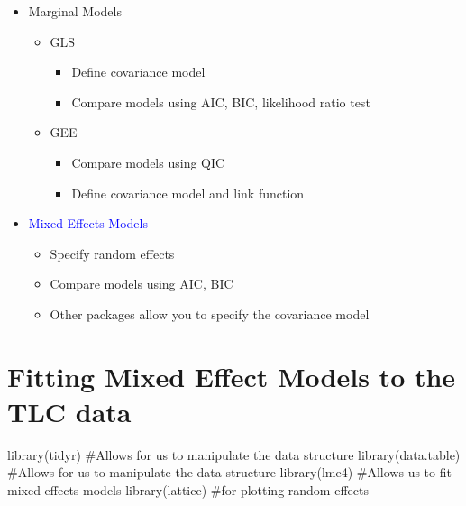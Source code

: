 \documentclass[
  letterpaper,
  DIV=11,
  numbers=noendperiod]{scrreprt}
\newenvironment{Shaded}{\begin{snugshade}}{\end{snugshade}}
\newcommand{\CommentTok}[1]{\textcolor[rgb]{0.37,0.37,0.37}{#1}}
\newcommand{\FunctionTok}[1]{\textcolor[rgb]{0.28,0.35,0.67}{#1}}
\newcommand{\NormalTok}[1]{\textcolor[rgb]{0.00,0.23,0.31}{#1}}
\providecommand{\tightlist}{%
  \setlength{\itemsep}{0pt}\setlength{\parskip}{0pt}}\usepackage{longtable,booktabs,array}
\begin{document}
\begin{itemize}
\tightlist
\item
  Marginal Models

  \begin{itemize}
  \tightlist
  \item
    GLS

    \begin{itemize}
    \tightlist
    \item
      Define covariance model
    \item
      Compare models using AIC, BIC, likelihood ratio test
    \end{itemize}
  \item
    GEE

    \begin{itemize}
    \tightlist
    \item
      Compare models using QIC
    \item
      Define covariance model and link function
    \end{itemize}
  \end{itemize}
\item
  \textcolor{blue}{Mixed-Effects Models}

  \begin{itemize}
  \tightlist
  \item
    Specify random effects
  \item
    Compare models using AIC, BIC
  \item
    Other packages allow you to specify the covariance model
  \end{itemize}
\end{itemize}

\hypertarget{fitting-mixed-effect-models-to-the-tlc-data}{%
\section{Fitting Mixed Effect Models to the TLC
data}\label{fitting-mixed-effect-models-to-the-tlc-data}}

\begin{Shaded}
\begin{Highlighting}[]
\FunctionTok{library}\NormalTok{(tidyr)  }\CommentTok{\#Allows for us to manipulate the data structure}
\FunctionTok{library}\NormalTok{(data.table)  }\CommentTok{\#Allows for us to manipulate the data structure}
\FunctionTok{library}\NormalTok{(lme4)  }\CommentTok{\#Allows us to fit mixed effects models}
\FunctionTok{library}\NormalTok{(lattice)  }\CommentTok{\#for plotting random effects}
\end{Highlighting}
\end{Shaded}
\end{document}
